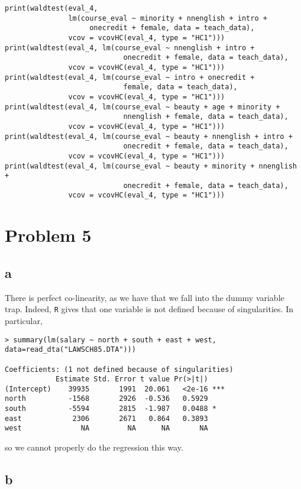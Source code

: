 \documentclass[12pt,letterpaper]{article}
\theoremstyle{definition}
\begin{document}
\begin{Verbatim}[fontsize=\small]
print(waldtest(eval_4,
               lm(course_eval ~ minority + nnenglish + intro +
                    onecredit + female, data = teach_data),
               vcov = vcovHC(eval_4, type = "HC1")))
print(waldtest(eval_4, lm(course_eval ~ nnenglish + intro +
                            onecredit + female, data = teach_data),
               vcov = vcovHC(eval_4, type = "HC1")))
print(waldtest(eval_4, lm(course_eval ~ intro + onecredit +
                            female, data = teach_data),
               vcov = vcovHC(eval_4, type = "HC1")))
print(waldtest(eval_4, lm(course_eval ~ beauty + age + minority +
                            nnenglish + female, data = teach_data),
               vcov = vcovHC(eval_4, type = "HC1")))
print(waldtest(eval_4, lm(course_eval ~ beauty + nnenglish + intro +
                            onecredit + female, data = teach_data),
               vcov = vcovHC(eval_4, type = "HC1")))
print(waldtest(eval_4, lm(course_eval ~ beauty + minority + nnenglish +
                            onecredit + female, data = teach_data),
               vcov = vcovHC(eval_4, type = "HC1")))

\end{Verbatim}

\section*{Problem 5}
\subsection*{a}

There is perfect co-linearity, as we have that we fall into the dummy variable trap. Indeed, \verb|R| gives that one variable is not defined because of singularities. In particular,
\begin{Verbatim}[fontsize=\small]
> summary(lm(salary ~ north + south + east + west, data=read_dta("LAWSCH85.DTA")))

Coefficients: (1 not defined because of singularities)
            Estimate Std. Error t value Pr(>|t|)
(Intercept)    39935       1991  20.061   <2e-16 ***
north          -1568       2926  -0.536   0.5929
south          -5594       2815  -1.987   0.0488 *
east            2306       2671   0.864   0.3893
west              NA         NA      NA       NA
\end{Verbatim}
so we cannot properly do the regression this way.

\subsection*{b}
\end{document}
